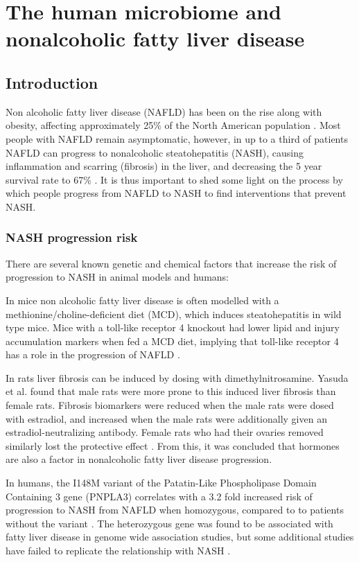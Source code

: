 \chapter{The human microbiome and nonalcoholic fatty liver disease}

\section{Introduction}
Non alcoholic fatty liver disease (NAFLD) has been on the rise along with obesity, affecting approximately 25\% of the North American population \cite{preiss2008non}. Most people with NAFLD remain asymptomatic, however, in up to a third of patients NAFLD can progress to nonalcoholic steatohepatitis (NASH), causing inflammation and scarring (fibrosis) in the liver, and decreasing the 5 year survival rate to 67\% \cite{propst1995prognosis}. It is thus important to shed some light on the process by which people progress from NAFLD to NASH to find interventions that prevent NASH.

\subsection{ NASH progression risk}
There are several known genetic and chemical factors that increase the risk of progression to NASH in animal models and humans:

In mice non alcoholic fatty liver disease is often modelled with a methionine/choline-deficient diet (MCD), which induces steatohepatitis in wild type mice. Mice with a toll-like receptor 4 knockout had lower lipid and injury accumulation markers when fed a MCD diet, implying that toll-like receptor 4 has a role in the progression of NAFLD \cite{rivera2007toll}.

In rats liver fibrosis can be induced by dosing with dimethylnitrosamine. Yasuda et al. \cite{yasuda1999suppressive} found that male rats were more prone to this induced liver fibrosis than female rats. Fibrosis biomarkers were reduced when the male rats were dosed with estradiol, and increased when the male rats were additionally given an estradiol-neutralizing antibody. Female rats who had their ovaries removed similarly lost the protective effect \cite{yasuda1999suppressive}. From this, it was concluded that hormones are also a factor in nonalcoholic fatty liver disease progression.

In humans, the I148M variant of the Patatin-Like Phospholipase Domain Containing 3 gene (PNPLA3) correlates with a 3.2 fold increased risk of progression to NASH from NAFLD when homozygous, compared to to patients without the variant \cite{sookoian2011meta}. The heterozygous gene was found to be associated with fatty liver disease in genome wide association studies, but some additional studies have failed to replicate the relationship with NASH \cite{sookoian2011meta}.

